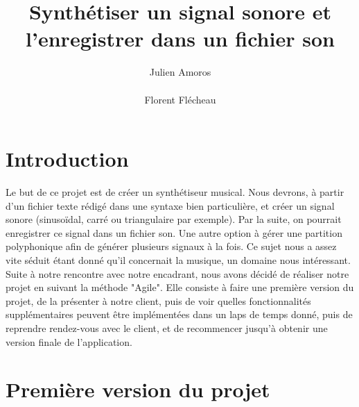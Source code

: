 \documentclass{EPUProjetPeiP}
\title[Synthétiseur Musical]{Synthétiser un signal sonore et l'enregistrer dans un fichier son}
\author{Julien Amoros\\ %
\noindent[\url{julien.amoros@etu.univ-tours.fr}]\\
Florent Flécheau\\ %
\noindent[\url{florent.flecheau@etu.univ-tours.fr}]}
\begin{document}
\maketitle

\setcounter{page}{0}

{
\setlength{\parskip}{0em}

\tableofcontents

\listoffigures

}

\start

\chapter*{Introduction}

Le but de ce projet est de créer un synthétiseur musical. Nous devrons, à partir d'un fichier texte rédigé dans une syntaxe bien particulière, et créer un signal sonore (sinusoïdal, carré ou triangulaire par exemple). Par la suite, on pourrait enregistrer ce signal dans un fichier son. Une autre option à gérer une partition polyphonique afin de générer plusieurs signaux à la fois. 
Ce sujet nous a assez vite séduit étant donné qu'il concernait la musique, un domaine nous intéressant.
Suite à notre rencontre avec notre encadrant, nous avons décidé de réaliser notre projet en suivant la méthode "Agile". Elle consiste à faire une première version du projet, de la présenter à notre client, puis de voir quelles fonctionnalités supplémentaires peuvent être implémentées dans un laps de temps donné, puis de reprendre rendez-vous avec le client, et de recommencer jusqu'à obtenir une version finale de l'application.


\chapter{Première version du projet}
\end{document}
